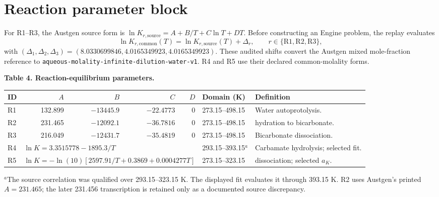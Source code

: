 \documentclass[10pt,oneside]{scrartcl}
\begin{document}
\section{Reaction parameter block}

For R1--R3, the Austgen source form is
$\ln K_{r,\mathrm{source}}=A+B/T+C\ln T+DT$. Before constructing an Engine
problem, the replay evaluates
\begin{equation}
\ln K_{r,\mathrm{common}}(T)=\ln K_{r,\mathrm{source}}(T)+\Delta_r,
\qquad r\in\{\mathrm{R1,R2,R3}\},
\label{eq:r123-standard-state}
\end{equation}
with $(\Delta_1,\Delta_2,\Delta_3)=(8.0330699846,\allowbreak
4.0165349923,\allowbreak4.0165349923)$. These audited shifts convert the
Austgen mixed mole-fraction reference to
\texttt{aqueous-molality-infinite-dilution-water-v1}. R4 and R5 use their
declared common-molality forms.

\begin{center}
{\sffamily\bfseries Table 4. Reaction-equilibrium parameters.}\par\vspace{3pt}
\small
\begin{tabularx}{\textwidth}{@{}p{}rrrrp{}Y@{}}
\toprule
ID & $A$ & $B$ & $C$ & $D$ & Domain (K) & Definition \\
\midrule
R1 & 132.899 & $-13445.9$ & $-22.4773$ & 0 & 273.15--498.15 & Water autoprotolysis. \\
R2 & 231.465 & $-12092.1$ & $-36.7816$ & 0 & 273.15--498.15 &  hydration to bicarbonate. \\
R3 & 216.049 & $-12431.7$ & $-35.4819$ & 0 & 273.15--498.15 & Bicarbonate dissociation. \\
R4 &  & 293.15--393.15$^{a}$ & Carbamate hydrolysis; selected fit. \\
R5 &  & 273.15--323.15 &  dissociation; selected $a_K$. \\
\bottomrule
\end{tabularx}
\end{center}

\footnotesize $^{a}$The source correlation was qualified over
293.15--323.15 K. The displayed fit evaluates it through 393.15 K.
R2 uses Austgen's printed $A=231.465$; the later 231.456 transcription is
retained only as a documented source discrepancy.
\normalsize
\clearpage
\end{document}
